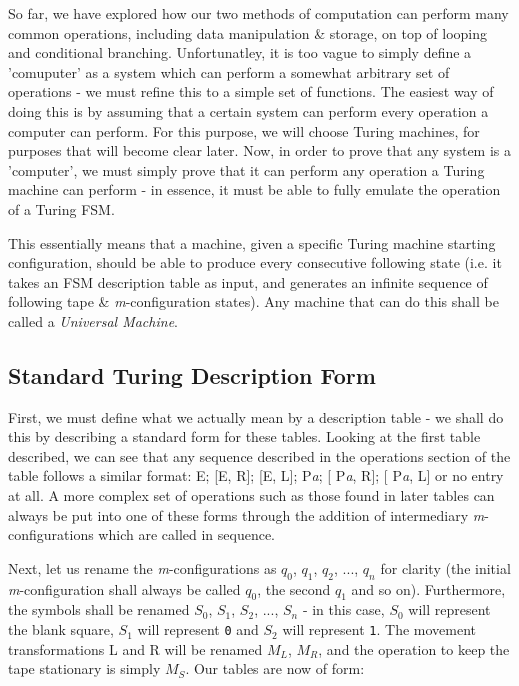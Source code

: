 \documentclass[Master.tex]{subfiles}
\begin{document}
\renewcommand{\arraystretch}{1.5}
So far, we have explored how our two methods of computation can perform many common operations, including data manipulation \& storage, on top of looping and conditional branching. Unfortunatley, it is too vague to simply define a 'comuputer' as a system which can perform a somewhat arbitrary set of operations - we must refine this to a simple set of functions. The easiest way of doing this is by assuming that a certain system can perform every operation a computer can perform. For this purpose, we will choose Turing machines, for purposes that will become clear later. Now, in order to prove that any system is a 'computer', we must simply prove that it can perform any operation a Turing machine can perform - in essence, it must be able to fully emulate the operation of a Turing FSM. 

 This essentially means that a machine, given a specific Turing machine starting configuration, should be able to produce every consecutive following state (i.e. it takes an FSM description table as input, and generates an infinite sequence of following tape \& \textit{m}-configuration states). Any machine that can do this shall be called a \textit{Universal Machine}.

\subsection{Standard Turing Description Form}

First, we must define what we actually mean by a description table - we shall do this by describing a standard form for these tables. Looking at the first table described, we can see that any sequence described in the operations section of the table follows a similar format: E; [E, R]; [E, L]; P\textit{a}; [ P\textit{a}, R]; [ P\textit{a}, L] or no entry at all. A more complex set of operations such as those found in later tables can always be put into one of these forms through the addition of intermediary \textit{m}-configurations which are called in sequence.

Next, let us rename the \textit{m}-configurations as $q_0$, $q_1$, $q_2$, $...$, $q_n$ for clarity (the initial \textit{m}-configuration shall always be called $q_0$, the second $q_1$ and so on). Furthermore, the symbols shall be renamed $S_0$, $S_1$, $S_2$, $...$, $S_n$ - in this case, $S_0$ will represent the blank square, $S_1$ will represent \texttt{0} and $S_2$ will represent \texttt{1}. The movement transformations L and R will be renamed $M_L$, $M_R$, and the operation to keep the tape stationary is simply $M_S$. Our tables are now of form:
\end{document}
